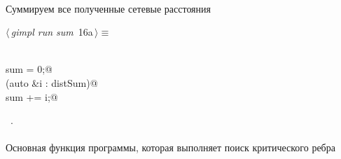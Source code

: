 \documentclass[12pt]{article}
\begin{document}
\paragraph{}
Суммируем все полученные сетевые расстояния
\begin{flushleft} \small
\begin{minipage}{\linewidth}\label{scrap30}\raggedright\small
{} $\langle\,${\itshape gimpl run sum}\nobreak\ {\footnotesize {16a}}$\,\rangle\equiv$
\vspace{-1ex}
\begin{list}{}{} \item
\mbox{}\verb@@\\
\mbox{}\verb@double sum = 0;@\\
\mbox{}\verb@for (auto &i : distSum)@\\
\mbox{}\verb@    sum += i;@\\
\mbox{}\verb@@{\NWsep}
\end{list}
\vspace{-1.5ex}
\footnotesize
\begin{list}{}{\setlength{\itemsep}{-\parsep}\setlength{\itemindent}{-\leftmargin}}
\item \NWtxtMacroRefIn\ .

\item{}
\end{list}
\end{minipage}\vspace{4ex}
\end{flushleft}
\paragraph{}
Основная функция программы, которая выполняет поиск критического ребра
\end{document}
